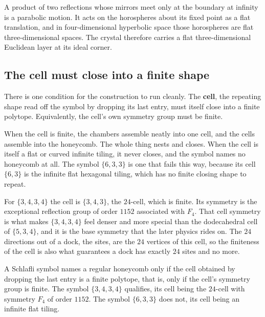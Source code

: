 \begin{lemma}
A product of two reflections whose mirrors meet only at the boundary at infinity is a parabolic motion. It acts on the horospheres about its fixed point as a flat translation, and in four-dimensional hyperbolic space those horospheres are flat three-dimensional spaces. The crystal therefore carries a flat three-dimensional Euclidean layer at its ideal corner.
\end{lemma}

\subsection{The cell must close into a finite shape}

There is one condition for the construction to run cleanly. The \textbf{cell}, the repeating shape read off the symbol by dropping its last entry, must itself close into a finite polytope. Equivalently, the cell's own symmetry group must be finite.

When the cell is finite, the chambers assemble neatly into one cell, and the cells assemble into the honeycomb. The whole thing nests and closes. When the cell is itself a flat or curved infinite tiling, it never closes, and the symbol names no honeycomb at all. The symbol $\{6,3,3\}$ is one that fails this way, because its cell $\{6,3\}$ is the infinite flat hexagonal tiling, which has no finite closing shape to repeat.

For $\{3,4,3,4\}$ the cell is $\{3,4,3\}$, the $24$-cell, which is finite. Its symmetry is the exceptional reflection group of order $1152$ associated with $F_4$. That cell symmetry is what makes $\{3,4,3,4\}$ feel denser and more special than the dodecahedral cell of $\{5,3,4\}$, and it is the base symmetry that the later physics rides on. The $24$ directions out of a dock, the sites, are the $24$ vertices of this cell, so the finiteness of the cell is also what guarantees a dock has exactly $24$ sites and no more.

\begin{proposition}
A Schlafli symbol names a regular honeycomb only if the cell obtained by dropping the last entry is a finite polytope, that is, only if the cell's symmetry group is finite. The symbol $\{3,4,3,4\}$ qualifies, its cell being the $24$-cell with symmetry $F_4$ of order $1152$. The symbol $\{6,3,3\}$ does not, its cell being an infinite flat tiling.
\end{proposition}

